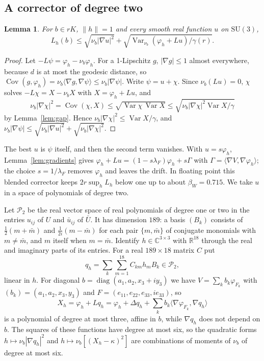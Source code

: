 \documentclass[aps,prd,twocolumn,superscriptaddress,nofootinbib,longbibliography,floatfix,amsmath,amssymb,10pt]{revtex4-2}
\newtheorem{lemma}[theorem]{Lemma}
\theoremstyle{definition}
\theoremstyle{remark}
\newcommand{\R}{\mathbb{R}}
\newcommand{\C}{\mathbb{C}}
\newcommand{\SU}{\mathrm{SU}}
\newcommand{\Cov}{\operatorname{Cov}}
\newcommand{\Var}{\operatorname{Var}}
\newcommand{\ip}[2]{\langle #1,#2\rangle}
\begin{document}
\subsection{A corrector of degree two}

\begin{lemma}\label{lem:corrector}
For $b\in rK$, $\|h\|=1$ and every smooth real function $u$ on $\SU(3)$,
\[
L_h(b)\le\sqrt{\nu_b|\nabla u|^2}+\sqrt{\Var_{\nu_b}(\varphi_h+Lu)/
\gamma(r)} .
\]
\end{lemma}

\begin{proof}
Let $-L\psi=\varphi_h-\nu_b\varphi_h$. For a 1-Lipschitz $g$, $|\nabla g|\le1$
almost everywhere, because $d$ is at most the geodesic distance, so
$\Cov(g,\varphi_h)=\nu_b\ip{\nabla g}{\nabla\psi}\le\nu_b|\nabla\psi|$. Write
$\psi=u+\chi$. Since $\nu_b(Lu)=0$, $\chi$ solves $-L\chi=X-\nu_bX$ with
$X=\varphi_h+Lu$, and
\[
\nu_b|\nabla\chi|^2=\Cov(\chi,X)\le\sqrt{\Var\chi\,\Var X}\le
\sqrt{\nu_b|\nabla\chi|^2\Var X/\gamma}
\]
by Lemma~\ref{lem:gap}. Hence $\nu_b|\nabla\chi|^2\le\Var X/\gamma$, and
$\nu_b|\nabla\psi|\le\sqrt{\nu_b|\nabla u|^2}+\sqrt{\nu_b|\nabla
\chi|^2}$.
\end{proof}

The best $u$ is $\psi$ itself, and then the second term vanishes. With
$u=s\varphi_h$, Lemma~\ref{lem:gradients} gives $\varphi_h+Lu=(1-s\lambda_F)
\varphi_h+s\Gamma$ with $\Gamma=\ip{\nabla V}{\nabla\varphi_h}$; the choice
$s=1/\lambda_F$ removes $\varphi_h$ and leaves the drift. In floating
point this blended corrector keeps $2r\sup_hL_h$ below one up to about
$\beta_W=0.715$. We take $u$ in a space of
polynomials of degree two.

Let $\mathcal P_2$ be the real vector space of real polynomials of degree one
or two in the entries $u_{ij}$ of $U$ and $\bar u_{ij}$ of $\bar U$. It has
dimension $189$: a basis $(B_k)$ consists of $\frac12(m+\bar m)$ and
$\frac1{2i}(m-\bar m)$ for each pair $\{m,\bar m\}$ of conjugate monomials with
$m\ne\bar m$, and $m$ itself when $m=\bar m$. Identify $h\in\C^{3\times3}$
with $\R^{18}$ through the real and imaginary parts of its entries. For a real
$189\times18$ matrix $C$ put
\[
q_h=\sum_{k}\sum_{m=1}^{18}C_{km}h_mB_k\in\mathcal P_2 ,
\]
linear in $h$. For diagonal $b=\operatorname{diag}(a_1,a_2,x_3+iy_3)$ we have
$V=\sum_kb_k\varphi_{F_k}$ with $(b_k)=(a_1,a_2,x_3,y_3)$ and $F=(e_{11},e_{22},
e_{33},ie_{33})$, so
\begin{equation}\label{eq:Xq}
X_h=\varphi_h+Lq_h=\varphi_h+\Delta q_h+\sum_kb_k\ip{\nabla\varphi_{F_k}}
{\nabla q_h}
\end{equation}
is a polynomial of degree at most three, affine in $b$, while $\nabla q_h$
does not depend on $b$. The squares of these functions have degree at most
six, so the quadratic forms $h\mapsto\nu_b|\nabla q_h|^2$ and
$h\mapsto\nu_b[(X_h-\kappa)^2]$ are combinations of moments of $\nu_b$ of
degree at most six.
\end{document}

